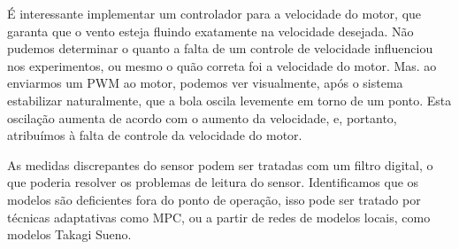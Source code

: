 É interessante implementar um controlador para a velocidade do motor, que garanta que o vento esteja fluindo exatamente na velocidade desejada. Não pudemos determinar o quanto a falta de um controle de velocidade influenciou nos experimentos, ou mesmo o quão correta foi a velocidade do motor. Mas. ao enviarmos um PWM ao motor, podemos ver visualmente, após o sistema estabilizar naturalmente, que a bola oscila levemente em torno de um ponto. Esta oscilação aumenta de acordo com o aumento da velocidade, e, portanto, atribuímos à falta de controle da velocidade do motor.


As medidas discrepantes do sensor podem ser tratadas com um filtro digital, o que poderia resolver os problemas de leitura do sensor. Identificamos que os modelos são deficientes fora do ponto de operação, isso pode ser tratado por técnicas adaptativas como MPC, ou a partir de redes de modelos locais, como modelos Takagi Sueno.



